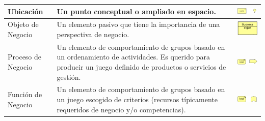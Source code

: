 \begin{table}[H]
\begin{tabular}{| m{4cm} | m{4cm} | m{4cm} | }
		\hline
		\centering\vspace{1.52mm}Ubicación & \vspace{1.52mm}Un punto conceptual o ampliado en espacio.& \vspace{1.52mm}\includegraphics[width=40mm]{arquitectura/imagenes/15} \\
		\hline
		\centering\vspace{1.52mm}Objeto de Negocio & \vspace{1.52mm}Un elemento pasivo que tiene la importancia de una perspectiva de negocio. & \vspace{1.52mm}\includegraphics[width=20mm]{arquitectura/imagenes/16} \\
		\hline
		\centering\vspace{1.52mm}Proceso de Negocio & \vspace{1.52mm}Un elemento de comportamiento de grupos basado en un ordenamiento de actividades. Es querido para producir un juego definido de productos o servicios de gestión. & \vspace{1.52mm}\includegraphics[width=40mm]{arquitectura/imagenes/17} \\
		\hline
		\centering\vspace{1.52mm}Función de Negocio & \vspace{1.52mm}Un elemento de comportamiento de grupos basado en un juego escogido de criterios (recursos típicamente requeridos de negocio y/o competencias).  & \vspace{1.52mm}\includegraphics[width=40mm]{arquitectura/imagenes/18} \\
		\hline
	\end{tabular}
\end{table}

